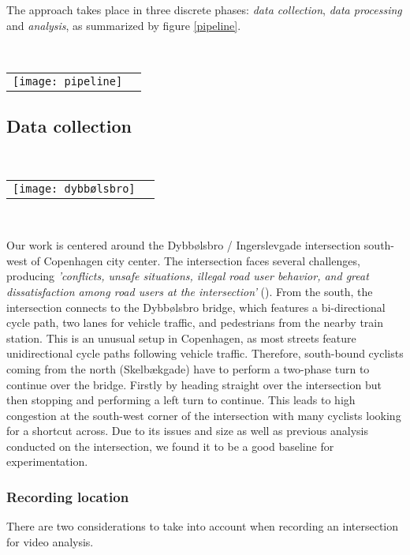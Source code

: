 The approach takes place in three discrete phases: \textit{data collection}, \textit{data processing} and \textit{analysis}, as summarized
by figure \ref{pipeline}.

\ \\ 
\raggedbottom
\begin{tabular}{@{}cc}
\texttt{[image: pipeline]} 
\end{tabular}
\label{pipeline}

\subsection{Data collection}
\ \\ 
\noindent
\begin{tabular}{@{}cc}
\texttt{[image: dybbølsbro]}
\end{tabular}
\label{intersection_overview}
\

Our work is centered around the Dybbølsbro / Ingerslevgade intersection south-west of Copenhagen
city center. The intersection faces several challenges, producing \textit{'conflicts, unsafe situations, illegal 
road user behavior, and great dissatisfaction among road users at the intersection'} (\cite{CPHpost_2021}).
From the south, the intersection connects to the Dybbølsbro bridge, which features a bi-directional cycle path, two
lanes for vehicle traffic, and pedestrians from the nearby train station. 
This is an unusual setup in Copenhagen, as most streets feature unidirectional cycle paths 
following vehicle traffic. Therefore, south-bound cyclists coming from the north (Skelbækgade) have to perform a two-phase 
turn to continue over the bridge. Firstly by heading straight over the intersection but then stopping and performing a left turn to 
continue. This leads to high congestion at the south-west corner of the intersection with many cyclists looking for a shortcut across. 
Due to its issues and size as well as previous analysis conducted on the intersection, we found it to be a good baseline for experimentation.

\subsubsection{Recording location}
There are two considerations to take into account when recording an intersection for video analysis.
\ \\

